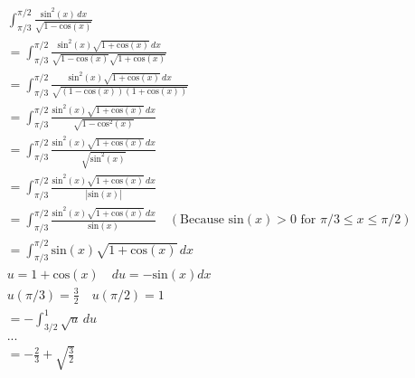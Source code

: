 \documentclass[11pt]{article}
\begin{document}
\begin{align*}
&\int_{\pi/3}^{\pi/2} \frac{\text{sin}^2(x) \, dx}{\sqrt{1-\text{cos}(x)}} \\
&=\int_{\pi/3}^{\pi/2} \frac{\text{sin}^2(x)\sqrt{1+\text{cos}(x)} \, dx}{\sqrt{1-\text{cos}(x)}\sqrt{1+\text{cos}(x)}} \\
&=\int_{\pi/3}^{\pi/2} \frac{\text{sin}^2(x)\sqrt{1+\text{cos}(x)} \, dx}{\sqrt{(1-\text{cos}(x))(1+\text{cos}(x))}} \\
&=\int_{\pi/3}^{\pi/2} \frac{\text{sin}^2(x)\sqrt{1+\text{cos}(x)} \, dx}{\sqrt{1-\text{cos}^2(x)}} \\
&=\int_{\pi/3}^{\pi/2} \frac{\text{sin}^2(x)\sqrt{1+\text{cos}(x)} \, dx}{\sqrt{\text{sin}^2(x)}} \\
&=\int_{\pi/3}^{\pi/2} \frac{\text{sin}^2(x)\sqrt{1+\text{cos}(x)} \, dx}{|\text{sin}(x)|} \\
&=\int_{\pi/3}^{\pi/2} \frac{\text{sin}^2(x)\sqrt{1+\text{cos}(x)} \, dx}{\text{sin}(x)} \quad (\text{Because sin}(x) > 0 \text{ for } \pi/3\leq x \leq \pi/2)\\
&=\int_{\pi/3}^{\pi/2} \text{sin}(x)\sqrt{1+\text{cos}(x)} \, dx \\
&u = 1+\text{cos}(x) \quad du = -\text{sin}(x) dx\\
&u(\pi/3) = \frac{3}{2} \quad u(\pi/2) = 1\\
&=-\int_{3/2}^{1} \sqrt{u} \, du\\
&...\\
&=-\frac{2}{3} + \sqrt{\frac{3}{2}}
\end{align*}
\end{document}
